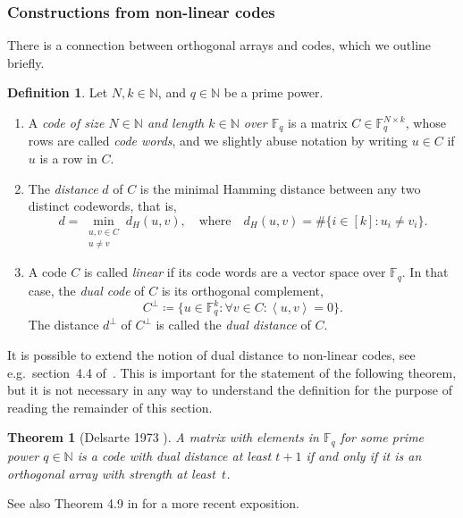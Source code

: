 \documentclass[11pt, letterpaper]{article}
\newtheorem{theorem}{Theorem}
\theoremstyle{definition}
\newtheorem{definition}{Definition}
\theoremstyle{remark}
\newcommand{\N}{\mathbb{N}}
\begin{document}
\begin{appendices}
\subsubsection{Constructions from non-linear codes}
There is a connection between orthogonal arrays and codes, which we outline briefly.

\begin{definition}\label{def:code}
    Let $N,k\in \N$, and $q\in \N$ be a prime power.
    \begin{enumerate}
        \item[(i)] A \emph{code of size $N\in \N$ and length $k\in \N$ over $\mathbb{F}_q$} is a matrix $C \in \mathbb{F}_q^{N \times k}$, whose rows are called \emph{code words}, and we slightly abuse notation by writing $u\in C$ if $u$ is a row in $C$.
        \item[(ii)] The \emph{distance} $d$ of $C$ is the minimal Hamming distance between any two distinct codewords, that is, \[
    d = \min_{\substack{u,v\in C\\ u\neq v}} d_H(u,v),\quad \text{where} \quad d_H(u,v) = \#\{ i\in [k]\colon u_i \neq v_i\}.
    \]
        \item[(iii)] A code $C$ is called \emph{linear} if its code words are a vector space over $\mathbb{F}_q$. In that case, the \emph{dual code} of $C$ is its orthogonal complement, \[
        C^\perp \coloneqq \{ u\in \mathbb{F}_q^k\colon \forall v\in C\colon \left< u,v\right> = 0\}.
        \] The distance $d^\perp$ of $C^\perp$ is called the \emph{dual distance} of $C$.
    \end{enumerate}
\end{definition}

It is possible to extend the notion of dual distance to non-linear codes, see e.g.\ section~4.4 of~\cite{hedayat2012}. This is important for the statement of the following theorem, but it is not necessary in any way to understand the definition for the purpose of reading the remainder of this section.

\begin{theorem}[Delsarte 1973 \cite{delsarte1973algebraic}]\label{thm:dualdistance}
    A matrix with elements in $\mathbb{F}_q$ for some prime power $q\in \N$ is a code with dual distance at least $t+1$ if and only if it is an orthogonal array with strength at least~$t$.
\end{theorem}

See also Theorem 4.9 in \cite{hedayat2012} for a more recent exposition.


\end{appendices}
\end{document}
